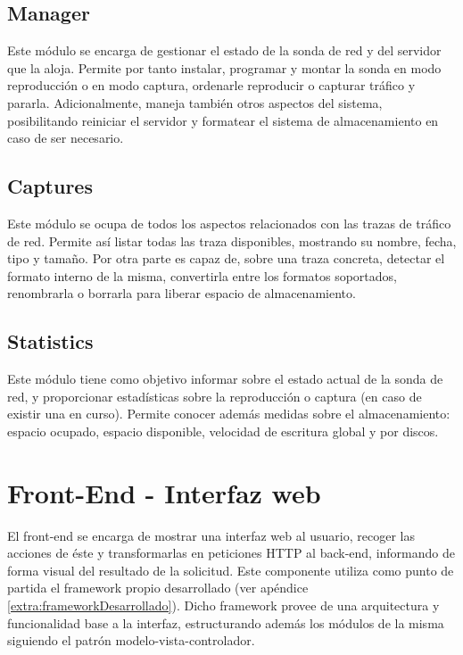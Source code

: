 \subsection{Manager\label{ssec:dis:manager}}

Este módulo se encarga de gestionar el estado de la sonda de red y del servidor que la aloja.
Permite por tanto instalar, programar y montar la sonda en modo reproducción o en modo captura, ordenarle reproducir o capturar tráfico y pararla. Adicionalmente, maneja también otros aspectos del sistema, posibilitando reiniciar el servidor y formatear el sistema de almacenamiento en caso de ser necesario.


\subsection{Captures\label{ssec:dis:captures}}

Este módulo se ocupa de todos los aspectos relacionados con las \glspl{traza} de tráfico de red.
Permite así listar todas las \gls{traza} disponibles, mostrando su nombre, fecha, tipo y tamaño.
Por otra parte es capaz de, sobre una \gls{traza} concreta, detectar el formato interno de la misma, convertirla entre los formatos soportados, renombrarla o borrarla para liberar espacio de almacenamiento.


\subsection{Statistics\label{ssec:dis:statistics}}

Este módulo tiene como objetivo informar sobre el estado actual de la sonda de red, y proporcionar estadísticas sobre la reproducción o captura (en caso de existir una en curso).
Permite conocer además medidas sobre el almacenamiento: espacio ocupado, espacio disponible, velocidad de escritura global y por discos.


\section{Front-End - Interfaz web\label{sec:dis:interfaz_web}}

El \gls{front-end} se encarga de mostrar una interfaz web al usuario, recoger las acciones de éste y transformarlas en peticiones \gls{HTTP} al \gls{back-end}, informando de forma visual del resultado de la solicitud.
Este componente utiliza como punto de partida el \gls{framework} propio desarrollado (ver apéndice \ref{extra:frameworkDesarrollado}).
Dicho \gls{framework} provee de una arquitectura y funcionalidad base a la interfaz, estructurando además los módulos de la misma siguiendo el patrón modelo-vista-controlador.

